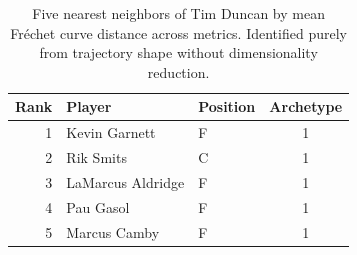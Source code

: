 \begin{table}[htbp]
  \centering\small
  \begin{tabular}{rllc}
    \toprule
    Rank & Player & Position & Archetype \\
    \midrule
    1 & Kevin Garnett & F & 1 \\
    2 & Rik Smits & C & 1 \\
    3 & LaMarcus Aldridge & F & 1 \\
    4 & Pau Gasol & F & 1 \\
    5 & Marcus Camby & F & 1 \\
    \bottomrule
  \end{tabular}
  \caption{Five nearest neighbors of Tim Duncan by mean Fr\'{e}chet curve distance across metrics. Identified purely from trajectory shape without dimensionality reduction.}
  \label{tab:Tim_Duncan_frechet_curve_neighbors}
\end{table}


